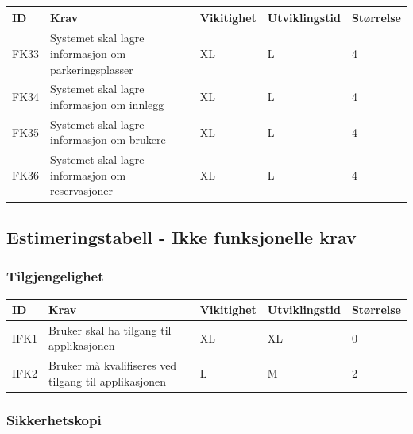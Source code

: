 \documentclass[12pt]{article}
\newcommand{\celly}{\cellcolor{yellow!25}}
\newcommand{\celll}{\cellcolor{lime!25}}
\begin{document}
        \begin{tabular}{|p{2cm}|p{6cm}|
            >{\centering\arraybackslash}p{2cm}|
            >{\centering\arraybackslash}p{2cm}|
            >{\centering\arraybackslash}p{2cm}|} 
            \hline
            \bf ID & \bf Krav & \bf Vikitighet & \bf Utviklingstid & \bf Størrelse\\
            \hline
            FK33
            &
            Systemet skal lagre informasjon om parkeringsplasser
            & XL & L & \celly 4\\
            \hline
            FK34
            &
            Systemet skal lagre informasjon om innlegg
            & XL & L & \celly 4\\
            \hline
            FK35
            &
            Systemet skal lagre informasjon om brukere
            & XL & L & \celly 4\\
            \hline
            FK36
            &
            Systemet skal lagre informasjon om reservasjoner
            & XL & L & \celly 4\\
            \hline
        \end{tabular}

    \subsection{Estimeringstabell - Ikke funksjonelle krav}

        \subsubsection{Tilgjengelighet}

        \begin{tabular}{|p{2cm}|p{6cm}|
            >{\centering\arraybackslash}p{2cm}|
            >{\centering\arraybackslash}p{2cm}|
            >{\centering\arraybackslash}p{2cm}|}
            \hline
            \bf ID & \bf Krav & \bf Vikitighet & \bf Utviklingstid & \bf Størrelse\\
            \hline
            IFK1
            &
            Bruker skal ha tilgang til applikasjonen
            & XL & XL & \celly 0\\
            \hline
            IFK2
            &
            Bruker må kvalifiseres ved tilgang til applikasjonen
            & L & M & \celll 2\\
            \hline
        \end{tabular}

        \subsubsection{Sikkerhetskopi}
\end{document}
